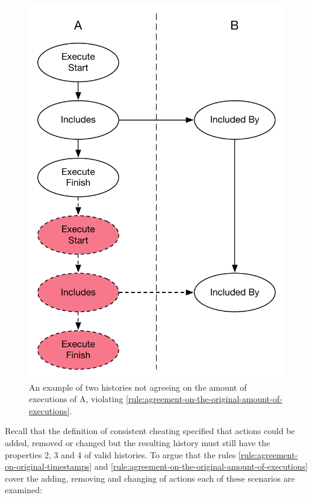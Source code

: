 \begin{figure}[H]
\begin{minipage}{.45\textwidth}
			\includegraphics[width=\textwidth]{5validation/images/agreement-on-original-amount-of-executions-2.pdf}
			\caption{An example of two histories not agreeing on the amount of executions of A, violating \autoref{rule:agreement-on-the-original-amount-of-executions}.}
			\label{fig:agreement-on-the-original-amount-of-executions-2}
		\end{minipage}
	\end{figure}
	
	\newpar Recall that the definition of consistent cheating specified that actions could be added, removed or changed but the resulting history must still have the properties 2, 3 and 4 of valid histories. To argue that the rules \ref{rule:agreement-on-original-timestamps} and \ref{rule:agreement-on-the-original-amount-of-executions} cover the adding, removing and changing of actions each of these scenarios are examined:
	
